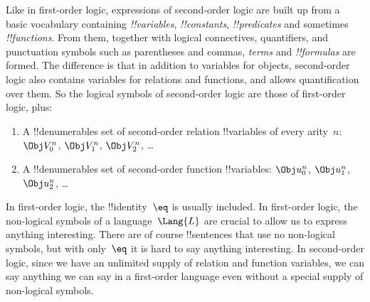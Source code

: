\documentclass[../../../include/open-logic-section]{subfiles}
\begin{document}

Like in first-order logic, expressions of second-order logic are built
up from a basic vocabulary containing \emph{!!{variable}s},
\emph{!!{constant}s}, \emph{!!{predicate}s} and sometimes
\emph{!!{function}s}.  From them, together with logical connectives,
quantifiers, and punctuation symbols such as parentheses and commas,
\emph{terms} and \emph{!!{formula}s} are formed.  The difference is
that in addition to variables for objects, second-order logic also
contains variables for relations and functions, and allows
quantification over them. So the logical symbols of second-order logic
are those of first-order logic, plus:

\begin{enumerate}
\item A !!{denumerable}s set of second-order relation !!{variable}s of
  every arity~$n$: $\Obj V_0^n$, $\Obj V_1^n$, $\Obj V_2^n$, \dots
\item A !!{denumerable}s set of second-order function !!{variable}s:
  $\Obj u_0^n$, $\Obj u_1^n$, $\Obj u_2^n$, \dots
\end{enumerate}

In first-order logic, the !!{identity}~$\eq$ is usually included. In
first-order logic, the non-logical symbols of a language~$\Lang{L}$
are crucial to allow us to express anything interesting. There are of
course !!{sentences} that use no non-logical symbols, but with
only~$\eq$ it is hard to say anything interesting.  In second-order
logic, since we have an unlimited supply of relation and function
variables, we can say anything we can say in a first-order language
even without a special supply of non-logical symbols.
\end{document}

